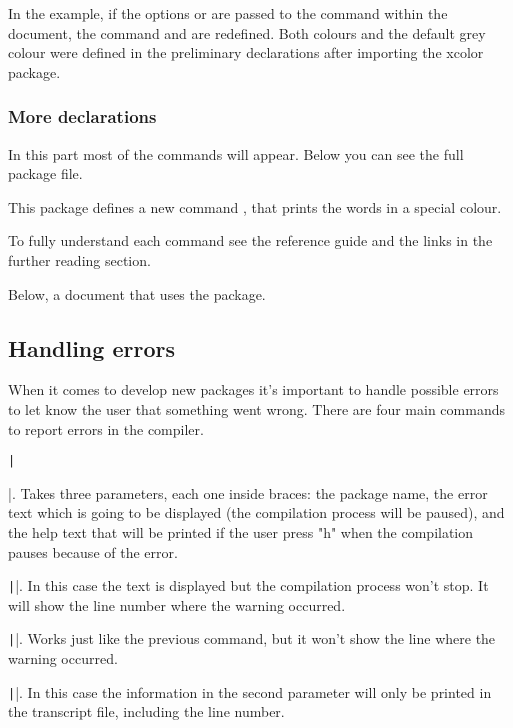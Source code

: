 In the example, if the options  or  are passed to the 
 command within the document, the command  and  are redefined. 
 Both colours and the default grey colour were defined in the preliminary declarations after importing the xcolor package.

\subsubsection{More declarations}

In this part most of the commands will appear. Below you can see the full package file.

This package defines a new command , that prints the words in a special colour.

To fully understand each command see the reference guide and the links in the further reading section.

Below, a document that uses the package.

\subsection{Handling errors}

When it comes to develop new packages it's important to handle possible errors to let know the user that something went wrong. There are four main commands to report errors in the compiler.

\texttt|\PackageError{package-name}{error-text}{help-text}|. Takes three parameters, each one inside braces: the package name, the error text which is going to be displayed (the compilation process will be paused), and the help text that will be printed if the user press "h" when the compilation pauses because of the error.

\texttt||. In this case the text is displayed but the compilation process won't stop. It will show the line number where the warning occurred.

\texttt||. Works just like the previous command, but it won't show the line where the warning occurred.

\texttt||. In this case the information in the second parameter will only be printed in the transcript file, including the line number.

